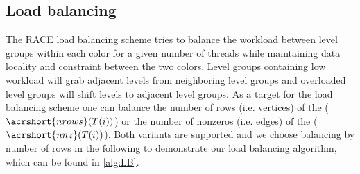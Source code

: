   \subsection{Load balancing}\label{subsec:LB} 
The RACE load balancing scheme tries to balance the workload between level groups within each color for a given number of threads while maintaining data locality and \DK constraint between the two colors. Level groups containing low workload will grab adjacent levels from neighboring level groups and overloaded level groups will shift levels to adjacent level groups. As a target for the load balancing scheme one can balance the number of rows (i.e. vertices) of the \levelGroups ($\acrshort{nrows}(T(i))$)  or the number of nonzeros (i.e. edges) of the \levelGroups ($\acrshort{nnz}(T(i))$). Both variants are supported and we choose balancing by number of rows in the following to demonstrate our load balancing algorithm, which can be found in \cref{alg:LB}.
 
